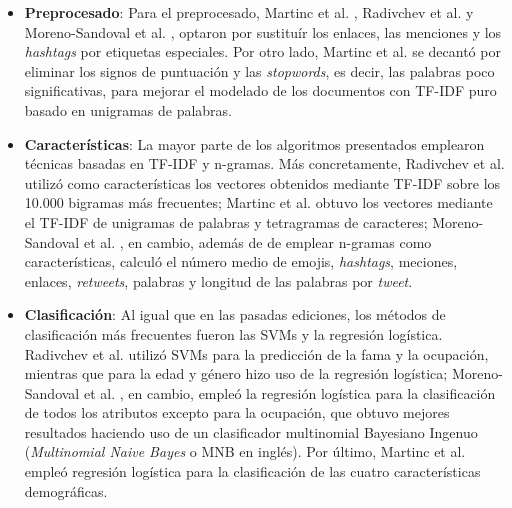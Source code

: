 \begin{itemize}
	\item \textbf{Preprocesado}: Para el preprocesado, Martinc et al. \cite{martinc2019hot}, Radivchev et al. \cite{radivchev2019celebrity}
	      y Moreno-Sandoval et al. \cite{moreno2019celebrity}, optaron por sustituír los enlaces,
	      las menciones y los \textit{hashtags} por etiquetas especiales. Por otro lado, Martinc et al. \cite{martinc2019hot} se decantó por eliminar los signos de puntuación
	      y las \textit{stopwords}, es decir, las palabras poco significativas, para mejorar el modelado de los documentos con TF-IDF puro basado en unigramas de palabras.
	\item \textbf{Características}: La mayor parte de los algoritmos presentados emplearon técnicas basadas en TF-IDF y n-gramas.
	      Más concretamente, Radivchev et al. \cite{radivchev2019celebrity} utilizó como características los vectores obtenidos mediante TF-IDF sobre los 10.000 bigramas más frecuentes;
	      Martinc et al. \cite{martinc2019hot} obtuvo los vectores mediante el TF-IDF de unigramas de palabras y tetragramas de caracteres; Moreno-Sandoval et al. \cite{moreno2019celebrity}, en cambio, además de
	      de emplear n-gramas como características, calculó el número medio de emojis, \textit{hashtags}, meciones, enlaces, \textit{retweets}, palabras y longitud de las
	      palabras por \textit{tweet}.
	\item \textbf{Clasificación}: Al igual que en las pasadas ediciones, los métodos de clasificación más frecuentes fueron las
	      SVMs y la regresión logística. Radivchev et al. \cite{radivchev2019celebrity} utilizó SVMs para la predicción de la fama y la ocupación, mientras que para la edad y género
	      hizo uso de la regresión logística; Moreno-Sandoval et al. \cite{moreno2019celebrity}, en cambio, empleó la regresión logística para la clasificación de todos los atributos
	      excepto para la ocupación, que obtuvo mejores resultados haciendo uso de un clasificador multinomial Bayesiano Ingenuo (\textit{Multinomial Naive Bayes} o MNB en inglés).
	      Por último, Martinc et al. \cite{martinc2019hot} empleó regresión logística para la clasificación de las cuatro características demográficas.
\end{itemize}

